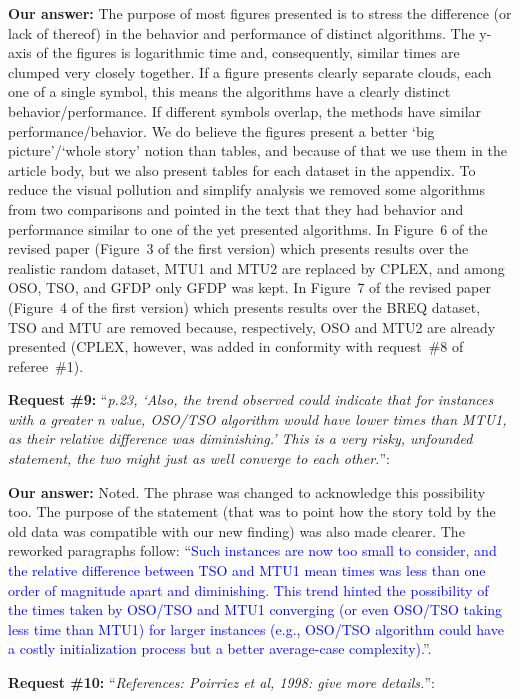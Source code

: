 \documentclass{elsarticle}
\begin{document}
\textbf{Our answer:} The purpose of most figures presented is to stress the difference (or lack of thereof) in the behavior and performance of distinct algorithms. The y-axis of the figures is logarithmic time and, consequently, similar times are clumped very closely together. If a figure presents clearly separate clouds, each one of a single symbol, this means the algorithms have a clearly distinct behavior/performance. If different symbols overlap, the methods have similar performance/behavior. We do believe the figures present a better `big picture'/`whole story' notion than tables, and because of that we use them in the article body, but we also present tables for each dataset in the appendix. To reduce the visual pollution and simplify analysis we removed some algorithms from two comparisons and pointed in the text that they had behavior and performance similar to one of the yet presented algorithms. In Figure~6 of the revised paper (Figure~3 of the first version) which presents results over the realistic random dataset, MTU1 and MTU2 are replaced by CPLEX, and among OSO, TSO, and GFDP only GFDP was kept. In Figure~7 of the revised paper (Figure~4 of the first version) which presents results over the BREQ dataset, TSO and MTU are removed because, respectively, OSO and MTU2 are already presented (CPLEX, however, was added in conformity with request~\#8 of referee~\#1).
\bigskip

\textbf{Request \#9:} ``\textit{p.23, `Also, the trend observed could indicate that for instances with a greater n value, OSO/TSO algorithm would have lower times than MTU1, as their relative difference was diminishing.' This is a very risky, unfounded statement, the two might just as well converge to each other.}'':

\textbf{Our answer:} Noted. The phrase was changed to acknowledge this possibility too. The purpose of the statement (that was to point how the story told by the old data was compatible with our new finding) was also made clearer. The reworked paragraphs follow: ``\textcolor{blue}{Such instances are now too small to consider, and the relative difference between TSO and MTU1 mean times was less than one order of magnitude apart and diminishing. This trend hinted the possibility of the times taken by OSO/TSO and MTU1 converging (or even OSO/TSO taking less time than MTU1) for larger instances (e.g., OSO/TSO algorithm could have a costly initialization process but a better average-case complexity).}''.
\bigskip

\textbf{Request \#10:} ``\textit{References: Poirriez et al, 1998: give more details.}'':
\end{document}

